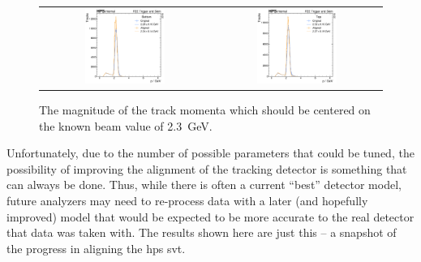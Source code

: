 \begin{figure}
  \centering
  \begin{tabular}{cc}
    \includegraphics[width=0.49\textwidth]{figures/hps/alignment/p_bottom.pdf}
    &
    \includegraphics[width=0.49\textwidth]{figures/hps/alignment/p_top.pdf}
  \end{tabular}
  \caption{The magnitude of the track momenta which should be centered on
  the known beam value of \qty{2.3}{\giga\electronvolt}.}
  \label{fig:example-align-p}
\end{figure}

Unfortunately, due to the number of possible parameters that could be tuned,
the possibility of improving the alignment of the tracking detector is something
that can always be done.
Thus, while there is often a current ``best'' detector model, future analyzers
may need to re-process data with a later (and hopefully improved) model that
would be expected to be more accurate to the real detector that data was taken with.
The results shown here are just this -- a snapshot of the progress in aligning the
\ac{hps} \ac{svt}.
